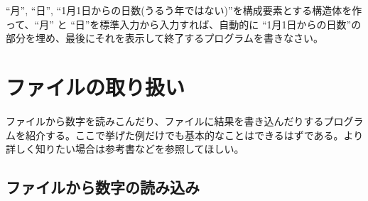 \begin{renshuu}\label{prob:7-1}
    ``月'', ``日'', ``1月1日からの日数(うるう年ではない)''を構成要素とする構造体を作って、``月'' と ``日''を標準入力から入力すれば、自動的に ``1月1日からの日数''の部分を埋め、最後にそれを表示して終了するプログラムを書きなさい。
\end{renshuu}

\section{ファイルの取り扱い}

ファイルから数字を読みこんだり、ファイルに結果を書き込んだりするプログラムを紹介する。ここで挙げた例だけでも基本的なことはできるはずである。より詳しく知りたい場合は参考書などを参照してほしい。

\subsection{ファイルから数字の読み込み}

